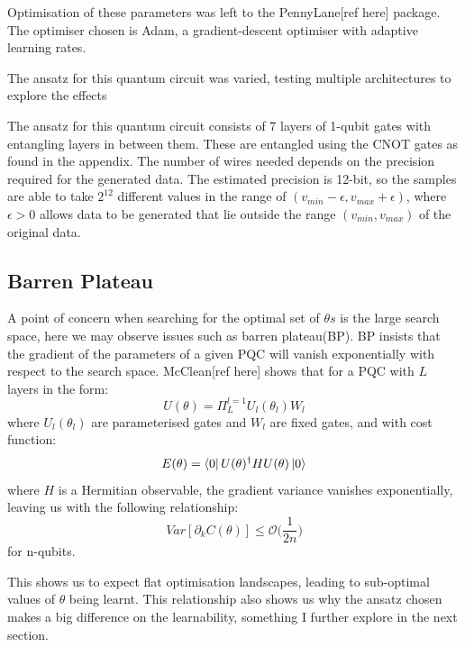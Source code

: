 \documentclass[12pt]{article}
\newcommand{\newp}
    {
    \vskip 0.5cm 
  }
\numberwithin{equation}{section}
\begin{document}
\newp
Optimisation of these parameters was left to the PennyLane[ref here] package. 
The optimiser chosen is Adam, a gradient-descent optimiser with adaptive 
learning rates.
\newp
The ansatz for this quantum circuit was varied, testing multiple architectures
to explore the effects
\newp
The ansatz for this quantum circuit consists of 7 layers
of 1-qubit gates with entangling layers in between them. These are 
entangled using the CNOT gates as found in the appendix. The number of wires 
needed depends on the precision required for the generated data. The estimated
precision is 12-bit, so the samples are able to take $2^{12}$ different values in 
the range of $ (v_{min} - \epsilon, v_{max} + \epsilon )$, where $\epsilon > 0 $
allows data to be generated that lie outside the range $(v_{min},v_{max})$ of the 
original data.
\newp
\subsection{Barren Plateau}
A point of concern when searching for the optimal set of $\theta s$ is the large 
search space, here we may observe issues such as barren plateau(BP). BP 
insists that the gradient of the parameters of a given PQC will vanish exponentially 
with respect to the search space. McClean[ref here] shows that for a PQC with $L$ layers in the form: 
\begin{equation}
  U(\theta) = \Pi_L^{l=1}U_l(\theta_l)W_l
\end{equation}
where $U_l(\theta_l)$ are parameterised gates and $W_l$ are fixed gates, and with 
cost function:
\begin{equation}
E(\theta) = \bra{0}U(\theta)^\dagger HU(\theta)\ket{0}
\end{equation}
where $H$ is a Hermitian observable, the gradient variance vanishes exponentially,
leaving us with the following relationship:
\begin{equation}
  Var[\partial_kC(\theta)] \leq \mathcal{O}\bigl(\frac{1}{2n}\bigr)
\end{equation}
for n-qubits. 
\newp 
This shows us to expect flat optimisation landscapes, leading to sub-optimal values
of $\theta$ being learnt. This relationship also shows us why the ansatz chosen 
makes a big difference on the learnability, something I further explore in the 
next section. 
\end{document}
